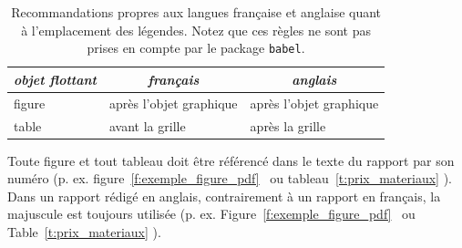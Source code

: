 \begin{table}[htp]
  \footnotesize
  \centering
  \caption{Recommandations propres aux langues française et anglaise quant à l'emplacement des légendes. Notez que ces règles ne sont pas prises en compte par le package \texttt{babel}.}
  \label{t:recommandations_typographiques_legende}
  \begin{tabular}{|l|l|l|}
    \hline\hline
    \multicolumn{1}{|c|}{\emph{objet flottant}}
    & \multicolumn{1}{c|}{\emph{français}}
    & \multicolumn{1}{c|}{\emph{anglais}}
    \\\hline

    figure
    & après l'objet graphique
    & après l'objet graphique
    \\

    table
    & avant la grille
    & après la grille
    \\

    \hline\hline
  \end{tabular}
\end{table}

Toute figure et tout tableau doit être référencé dans le texte du rapport par son numéro (p. ex. \og figure~\ref{f:exemple_figure_pdf} \fg\  ou \og tableau~\ref{t:prix_materiaux} \fg). Dans un rapport rédigé en anglais, contrairement à un rapport en français, la majuscule est toujours utilisée (p. ex. \og Figure~\ref{f:exemple_figure_pdf} \fg\  ou \og Table~\ref{t:prix_materiaux} \fg).
